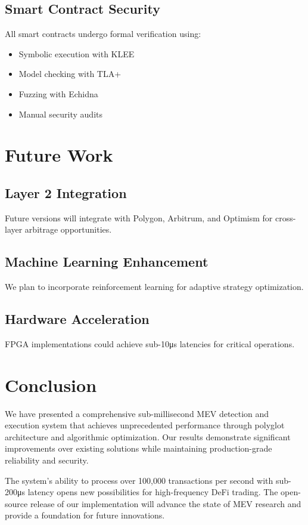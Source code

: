 \documentclass[12pt]{article}
\begin{document}
\subsection{Smart Contract Security}

All smart contracts undergo formal verification using:
\begin{itemize}
    \item Symbolic execution with KLEE
    \item Model checking with TLA+
    \item Fuzzing with Echidna
    \item Manual security audits
\end{itemize}

\section{Future Work}

\subsection{Layer 2 Integration}
Future versions will integrate with Polygon, Arbitrum, and Optimism for cross-layer arbitrage opportunities.

\subsection{Machine Learning Enhancement}
We plan to incorporate reinforcement learning for adaptive strategy optimization.

\subsection{Hardware Acceleration}
FPGA implementations could achieve sub-10μs latencies for critical operations.

\section{Conclusion}

We have presented a comprehensive sub-millisecond MEV detection and execution system that achieves unprecedented performance through polyglot architecture and algorithmic optimization. Our results demonstrate significant improvements over existing solutions while maintaining production-grade reliability and security.

The system's ability to process over 100,000 transactions per second with sub-200μs latency opens new possibilities for high-frequency DeFi trading. The open-source release of our implementation will advance the state of MEV research and provide a foundation for future innovations.
\end{document}
